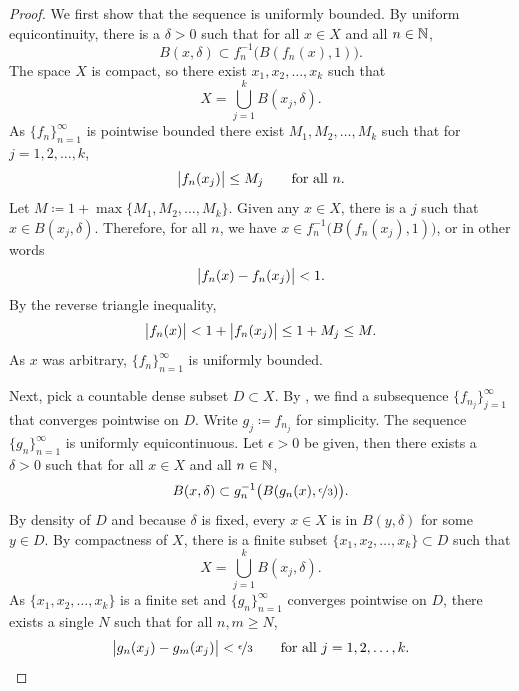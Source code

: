 \begin{proof}
We first show that the sequence is uniformly bounded.
By uniform equicontinuity,
there is a $\delta > 0$
such that
for all $x \in X$ and all $n \in {\mathbb{N}}$,
\begin{equation*}
B(x,\delta) \subset f_n^{-1}\bigl(B(f_n(x),1)\bigr) .
\end{equation*}
The space $X$ is compact, so there exist $x_1,x_2,\ldots,x_k$
such that
\begin{equation*}
X = \bigcup_{j=1}^k B(x_j,\delta) .
\end{equation*}
As $\{ f_n \}_{n=1}^\infty$ is pointwise bounded there exist $M_1,M_2,\ldots,M_k$
such that for $j=1,2,\ldots,k$,
\begin{equation*}
\bigl\lvert {f_n(x_j)} \bigr\rvert \leq M_j \qquad \text{for all } n.
\end{equation*}
Let $M \coloneqq 1+ \max \{ M_1,M_2,\ldots,M_k \}$.  Given any
$x \in X$, there is a $j$ such that $x \in B(x_j,\delta)$.  Therefore,
for all $n$, we have
$x \in f_n^{-1}\bigl(B(f_n(x_j),1)\bigr)$, or in other words
\begin{equation*}
\bigl\lvert {f_n(x)-f_n(x_j)} \bigr\rvert < 1 .
\end{equation*}
By the reverse triangle inequality,
\begin{equation*}
\bigl\lvert {f_n(x)} \bigr\rvert < 1+ \bigl\lvert {f_n(x_j)} \bigr\rvert \leq 1+M_j \leq M .
\end{equation*}
As $x$ was arbitrary, $\{f_n\}_{n=1}^\infty$ is uniformly bounded.


Next, pick a countable dense subset $D \subset X$.
By , we find
a subsequence $\{ f_{n_j} \}_{j=1}^\infty$ that converges pointwise on $D$.
Write $g_j \coloneqq f_{n_j}$ for simplicity.
The sequence $\{ g_n \}_{n=1}^\infty$ is 
uniformly equicontinuous.
Let $\epsilon > 0$ be given, then there exists a $\delta > 0$
such that for all $x \in X$ and all $n \in {\mathbb{N}}$,
\begin{equation*}
B(x,\delta) \subset g_n^{-1}\bigl(B(g_n(x),\nicefrac{\epsilon}{3})\bigr).
\end{equation*}
By density of $D$ and because $\delta$ is fixed, every $x \in X$ is in $B(y,\delta)$
for some $y \in D$.  By compactness of $X$,
there is a finite subset $\{ x_1,x_2,\ldots,x_k \} \subset D$
such that
\begin{equation*}
X = \bigcup_{j=1}^k B(x_j,\delta) .
\end{equation*}
As $\{ x_1,x_2,\ldots,x_k \}$
is a finite set and $\{ g_n \}_{n=1}^\infty$
converges pointwise on $D$, there exists a single $N$ such that for 
all $n,m \geq N$,
\begin{equation*}
\bigl\lvert {g_n(x_j)-g_m(x_j)} \bigr\rvert < \nicefrac{\epsilon}{3}
 \qquad \text{for all } j=1,2,\ldots,k.
\end{equation*}


\end{proof}
